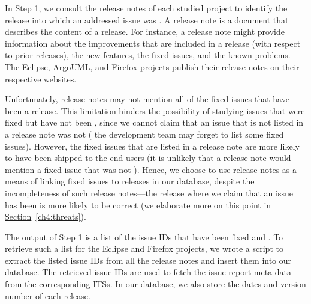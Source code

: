In Step 1, we consult the release notes of each studied project to identify the
release into which an addressed issue was \DIFdelbegin {}\DIFdelend \DIFaddbegin {}\DIFaddend . A release note is a
document that describes the content of a release. For instance, a release note
might provide information about the improvements that are included in a release (with
respect to prior releases), the new features, the fixed issues, and the known
problems. The Eclipse, ArgoUML, and Firefox projects publish their release notes on their
respective websites.

Unfortunately, release notes may not mention all of the fixed issues that have
been \DIFdelbegin {}\DIFdelend \DIFaddbegin {}\DIFaddend a release. This limitation hinders the possibility of
studying issues that were fixed but have not been \DIFdelbegin {}\DIFdelend \DIFaddbegin {}\DIFaddend , since we cannot
claim that an issue that is not listed in a release note was not \DIFdelbegin {}\DIFdelend \DIFaddbegin {}\DIFaddend (\eg
the development team may forget to list some \DIFdelbegin {}\DIFdelend \DIFaddbegin {}\DIFaddend fixed issues). However,
the fixed issues that are listed in a release note are more likely to have been
shipped to the end users (\ie it is unlikely that a release note would mention a fixed
issue that was not \DIFdelbegin {}\DIFdelend \DIFaddbegin {}\DIFaddend ). Hence, we choose to use release notes as a means
of linking fixed issues to releases in our database, despite the incompleteness
of such release notes---the release where we claim that an issue has been
\DIFdelbegin {}\DIFdelend \DIFaddbegin {}\DIFaddend is more likely to be correct (we elaborate more on this point in
\hyperref[ch4:threats]{Section}~\ref{ch4:threats}).

The output of Step 1 is a list of the issue IDs that have been fixed and
\DIFdelbegin {}\DIFdelend \DIFaddbegin {}\DIFaddend . To retrieve such a list for the Eclipse and Firefox projects, we
wrote a script to extract the listed issue IDs from all the release notes and
insert them into our database. The retrieved issue IDs are used to fetch the
issue report meta-data from the corresponding ITSs. In our database, we also
store the dates and version number of each release. 

